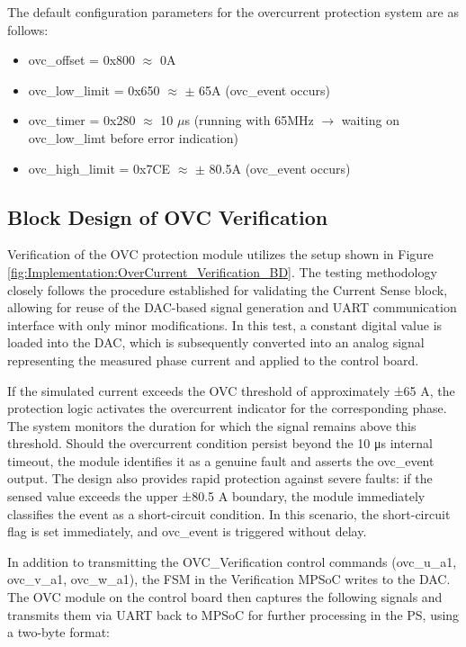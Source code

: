 The default configuration parameters for the overcurrent protection system are as follows:

\begin{itemize}
	\item ovc\_offset = 0x800 $\approx$ 0A
	\item ovc\_low\_limit = 0x650 $\approx$ $\pm$ 65A (ovc\_event occurs)
	\item ovc\_timer = 0x280 $\approx$ 10 $\mu$s (running with 65MHz $\rightarrow$ waiting on ovc\_low\_limt before error indication)
	\item ovc\_high\_limit = 0x7CE $\approx$ $\pm$ 80.5A (ovc\_event occurs)
\end{itemize}

\subsection{Block Design of \acs{OVC} Verification}
\label{sec:Implementation:BlockDesign_OVC_Verification}

Verification of the \acs{OVC} protection module utilizes the setup shown in Figure \ref{fig:Implementation:OverCurrent_Verification_BD}. The testing methodology closely follows the procedure established for validating the Current Sense block, allowing for reuse of the \acs{DAC}-based signal generation and \acs{UART} communication interface with only minor modifications. In this test, a constant digital value is loaded into the \acs{DAC}, which is subsequently converted into an analog signal representing the measured phase current and applied to the control board.

If the simulated current exceeds the \acs{OVC} threshold of approximately ±65 A, the protection logic activates the overcurrent indicator for the corresponding phase. The system monitors the duration for which the signal remains above this threshold. Should the overcurrent condition persist beyond the 10 μs internal timeout, the module identifies it as a genuine fault and asserts the ovc\_event output. The design also provides rapid protection against severe faults: if the sensed value exceeds the upper ±80.5 A boundary, the module immediately classifies the event as a short-circuit condition. In this scenario, the short-circuit flag is set immediately, and ovc\_event is triggered without delay.

In addition to transmitting the \acs{OVC}\_Verification control commands (ovc\_u\_a1, ovc\_v\_a1, ovc\_w\_a1), the \acs{FSM} in the Verification \acs{MPSoC} writes to the \acs{DAC}. The \acs{OVC} module on the control board then captures the following signals and transmits them via \acs{UART} back to \acs{MPSoC} for further processing in the \acs{PS}, using a two-byte format:

